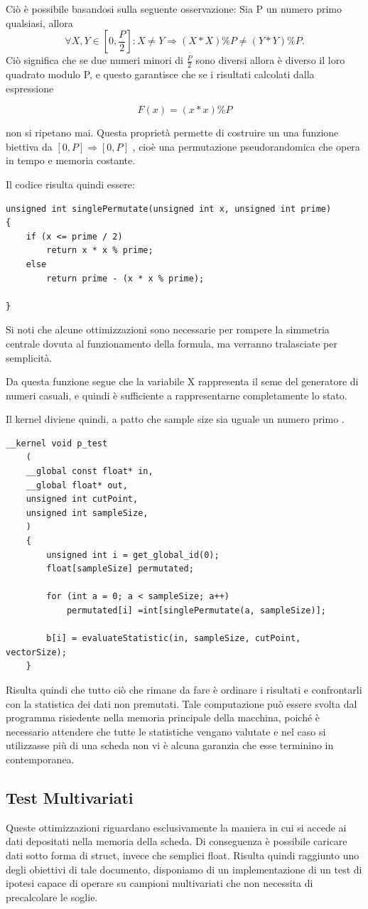 Ciò è possibile basandosi sulla seguente osservazione:
Sia P un numero primo qualsiasi, allora $$ \forall X, Y  \in [0,  \frac{P}{2} ] :  X \neq Y \Rightarrow (X * X) \% P \neq (Y * Y) \% P.$$
Ciò significa che se due numeri minori di $\frac{P}{2}$ sono diversi allora è diverso il loro quadrato modulo P, e questo garantisce che se i risultati calcolati dalla espressione

$$F(x) = (x * x)\%P$$

non si ripetano mai. Questa proprietà permette di costruire un una funzione biettiva da $[0, P] \Rightarrow [0, P]$ , cioè una permutazione pseudorandomica che opera in tempo e memoria costante.

Il codice risulta quindi essere:
 
\begin{lstlisting}[style=CStyle]
unsigned int singlePermutate(unsigned int x, unsigned int prime)
{	
	if (x <= prime / 2)
		return x * x % prime;
	else
		return prime - (x * x % prime);	

}
\end{lstlisting}

Si noti che alcune ottimizzazioni sono necessarie per rompere la simmetria centrale dovuta al funzionamento della formula, ma verranno tralasciate per semplicità.

Da questa funzione segue che la variabile X rappresenta il seme del generatore di numeri casuali, e quindi è sufficiente a rappresentarne completamente lo stato. 

Il kernel diviene quindi, a patto che sample size sia uguale un numero primo .
\begin{lstlisting}[style=CStyle]
	__kernel void p_test
	(
	__global const float* in,
	__global float* out,
	unsigned int cutPoint,
	unsigned int sampleSize,
	)
	{
		unsigned int i = get_global_id(0);
		float[sampleSize] permutated;
		
		for (int a = 0; a < sampleSize; a++)
			permutated[i] =int[singlePermutate(a, sampleSize)];
		
		b[i] = evaluateStatistic(in, sampleSize, cutPoint, vectorSize);
	}
\end{lstlisting}

Risulta quindi che tutto ciò che rimane da fare è ordinare i risultati e confrontarli con la statistica dei dati non premutati. Tale computazione può essere svolta dal programma risiedente nella memoria principale della macchina, poiché è necessario attendere che tutte le statistiche vengano valutate e nel caso si utilizzasse più di una scheda non vi è alcuna garanzia che esse terminino in contemporanea. 


\subsection{Test Multivariati}
Queste ottimizzazioni riguardano esclusivamente la maniera in cui si accede ai dati depositati nella memoria della scheda. Di conseguenza è possibile caricare dati sotto forma di struct, invece che semplici float. Risulta quindi raggiunto uno degli obiettivi di tale documento, disponiamo di un implementazione di un test di ipotesi capace di operare su campioni multivariati che non necessita di precalcolare le soglie.